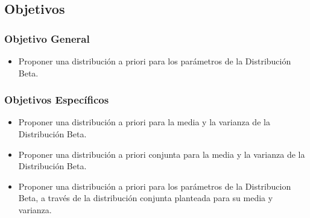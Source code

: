 \subsection{Objetivos}
\subsubsection{Objetivo General}
\begin{itemize}
\item Proponer una distribuci\'{o}n a priori para los par\'{a}metros de la Distribuci\'{o}n Beta.
\end{itemize}
\subsubsection{Objetivos Espec\'{i}ficos}

\begin{itemize}
\item Proponer una distribuci\'{o}n a priori para la media y la varianza de la Distribuci\'{o}n Beta. 

\item Proponer una distribuci\'{o}n a priori conjunta para la media y la varianza de la Distribuci\'{o}n Beta.

\item Proponer una distribuci\'{o}n a priori para los par\'{a}metros de la Distribucion Beta, a trav\'{e}s de la distribuci\'{o}n conjunta planteada para su media y varianza.

\end{itemize}

